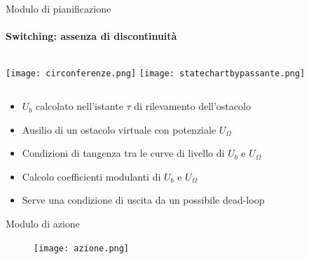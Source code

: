\documentclass[handout]{beamer}
\begin{document}
\begin{frame}{Modulo di pianificazione}
\framesubtitle{Switching: assenza di discontinuità}
\begin{columns}
\texttt{[image: circonferenze.png]}
\centering
\texttt{[image: statechartbypassante.png]}
\end{columns}
\vspace*{5mm}
\begin{itemize}
\item $U_b$ calcolato nell'istante $\tau$ di rilevamento dell'ostacolo
\item Ausilio di un ostacolo virtuale con potenziale $U_{\Omega}$
\item Condizioni di tangenza tra le curve di livello di $U_b$ e $U_{\Omega}$
\item Calcolo coefficienti modulanti di $U_b$ e $U_{\Omega}$
\item Serve una condizione di uscita da un possibile dead-loop
\end{itemize}
\end{frame}

\begin{frame}{Modulo di azione}
\centering
\begin{figure}
\texttt{[image: azione.png]}
\end{figure}
\end{frame}
\end{document}
